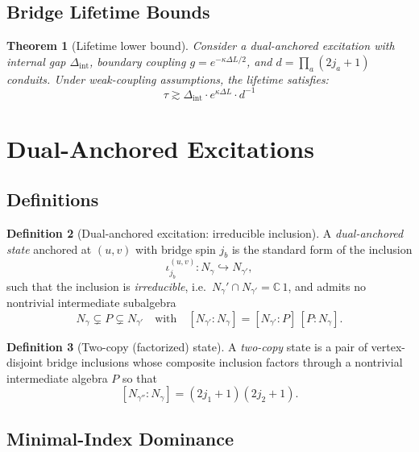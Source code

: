 \documentclass[11pt]{article}
\newcommand{\Index}[2]{\left[#1:#2\right]}
\theoremstyle{plain}
\newtheorem{theorem}{Theorem}[section]
\theoremstyle{definition}
\newtheorem{definition}[theorem]{Definition}
\begin{document}
\subsection{Bridge Lifetime Bounds}

\begin{theorem}[Lifetime lower bound]\label{thm:lifetime-derived}
  Consider a dual-anchored excitation with internal gap $\Delta_{\mathrm{int}}$, boundary coupling $g = e^{-\kappa \Delta L/2}$, and $d = \prod_a(2j_a+1)$ conduits. Under weak-coupling assumptions, the lifetime satisfies:
  \begin{equation}
    \tau \gtrsim \Delta_{\mathrm{int}} \cdot e^{\kappa \Delta L} \cdot d^{-1}
  \end{equation}
\end{theorem}

\section{Dual-Anchored Excitations}
\label{sec:dual-anchored}

\subsection{Definitions}

\begin{definition}[Dual-anchored excitation: irreducible inclusion]\label{def:dual-anchored-irreducible}
  A \emph{dual-anchored state} anchored at $(u,v)$ with bridge spin $j_b$ is the standard form of the inclusion
  \[
    \iota^{(u,v)}_{j_b}: N_\gamma \hookrightarrow N_{\gamma'} ,
  \]
  such that the inclusion is \emph{irreducible}, i.e.\ $N_\gamma' \cap N_{\gamma'} = \mathbb{C}\,1$, and admits no nontrivial intermediate subalgebra
  \[
    N_\gamma \subsetneq P \subsetneq N_{\gamma'} \quad\text{with}\quad \Index{N_{\gamma'}}{N_\gamma} = \Index{N_{\gamma'}}{P}\,\Index{P}{N_\gamma}.
  \]
\end{definition}

\begin{definition}[Two-copy (factorized) state]\label{def:two-copy}
  A \emph{two-copy} state is a pair of vertex-disjoint bridge inclusions whose composite inclusion factors through a nontrivial intermediate algebra $P$ so that
  \[
    \Index{N_{\gamma''}}{N_\gamma} = (2j_1+1)(2j_2+1).
  \]
\end{definition}

\subsection{Minimal-Index Dominance}
\end{document}
